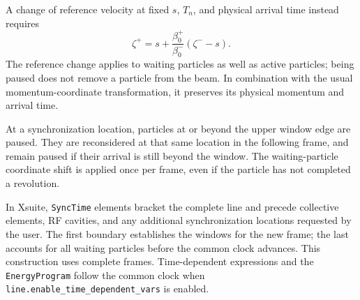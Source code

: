 A change of reference velocity at fixed $s$, $T_n$, and physical arrival
time instead requires
\begin{equation}
\boxed{
\zeta^+=s+\frac{\beta_0^+}{\beta_0^-}(\zeta^--s).
}
\label{eq:coasting_reference_zeta_update}
\end{equation}
The reference change applies to waiting particles as well as active particles;
being paused does not remove a particle from the beam. In combination with the
usual momentum-coordinate transformation, it preserves its physical momentum
and arrival time.

At a synchronization location, particles at or beyond the upper window edge
are paused. They are reconsidered at that same location in the following
frame, and remain paused if their arrival is still beyond the window.
The waiting-particle coordinate shift is applied once per frame, even if the
particle has not completed a revolution.

In Xsuite, \texttt{SyncTime} elements bracket the complete line and precede
collective elements, RF cavities, and any additional synchronization locations
requested by the user. The first boundary establishes the windows for the new
frame; the last accounts for all waiting particles before the common clock
advances. This construction uses complete frames. Time-dependent expressions
and the \texttt{EnergyProgram} follow the common clock when
\texttt{line.enable\_time\_dependent\_vars} is enabled.



